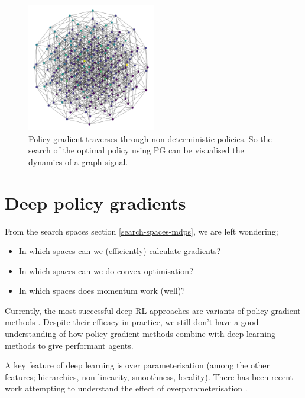 
\begin{figure}[!h]
\centering
\includegraphics[width=0.5\textwidth,height=0.3\textheight]{../../pictures/figures/interior-graph.png}
\caption{Policy gradient traverses through non-deterministic policies.
So the search of the optimal policy using PG can be visualised the dynamics of a graph signal.}
\end{figure}


\newpage
\section{Deep policy gradients}\label{ss-extras}

From the search spaces section \ref{search-spaces-mdps}, we are left wondering;

\begin{itemize}
\tightlist
\item In which spaces can we (efficiently) calculate gradients?
\item In which spaces can we do convex optimisation?
\item In which spaces does momentum work (well)?
\end{itemize}

Currently, the most successful deep RL approaches are variants of policy gradient methods \cite{Mnih2016,Schulmanb}.
Despite their efficacy in practice, we still don't have a good understanding of
how policy gradient methods combine with deep learning methods to give performant agents.

A key feature of deep learning is over parameterisation (among the other features;
hierarchies, non-linearity, smoothness, locality). There has been recent work
attempting to understand the effect of overparameterisation \cite{Arora2018}.

